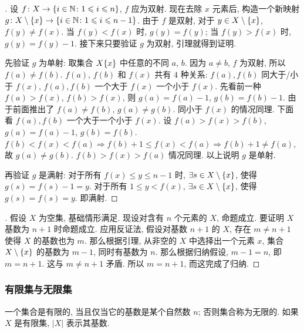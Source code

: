 \documentclass[UTF8]{ctexart}
\theoremstyle{mystyle}
\theoremstyle{myremark}
\theoremstyle{plain}
\newcommand{\N}{\mathbb N}
\DeclarePairedDelimiter\set{\{}{\}}
\begin{document}
\begin{proof}[]
    设 $ f \colon X \to \set{i \in \N \colon 1 \leqslant i \leqslant n} $, $ f $ 应为双射. 现在去除 $ x $ 元素后, 构造一个新映射 $ g \colon X \setminus \set x \to \set{i \in \N \colon 1 \leqslant i \leqslant n - 1} $. 由于 $ f $ 是双射, 对于 $ y \in X \setminus \set x $, $ f(y) \neq f(x) $. 当 $ f(y) < f(x) $ 时, $ g(y) = f(y) $; 当 $ f(y) > f(x) $ 时, $ g(y) = f(y) - 1 $. 接下来只要验证 $ g $ 为双射, 引理就得到证明. 
    
    先验证 $ g $ 为单射: 取集合 $ X \set{x} $ 中任意的不同 $ a $, $ b $. 因为 $ a \neq b $, $ f $ 为双射, 所以 $ f(a) \neq f(b) $. $ f(a) $, $ f(b) $ 和 $ f(x) $ 共有 $ 4 $ 种关系: $ f(a), f(b) $ 同大于/小于 $ f(x) $, $ f(a), f(b) $ 一个大于 $ f(x) $ 一个小于 $ f(x) $. 先看前一种 $ f(a) > f(x) $, $ f(b) > f(x) $, 则 $ g(a) = f(a) - 1 $, $ g(b) = f(b) - 1 $. 由于前面推出了 $ f(a) \neq f(b) $, $ g(a) \neq g(b) $. 同小于 $ f(x) $ 的情况同理. 下面看 $ f(a), f(b) $ 一个大于一个小于 $ f(x) $. 设 $ f(a) > f(x) > f(b) $, $ g(a) = f(a) - 1 $, $ g(b) = f(b) $. $ f(b) < f(x) < f(a) \Longrightarrow f(b) + 1 \leqslant f(x) < f(a) \Longrightarrow f(b) + 1 \neq f(a) $, 故 $ g(a) \neq g(b) $. $ f(b) > f(x) > f(a) $ 情况同理. 以上说明 $ g $ 是单射.

    再验证 $ g $ 是满射: 对于所有 $ f(x) \leqslant y \leqslant n - 1 $ 时, $ \exists s \in X \setminus \set x $, 使得 $ g(s) = f(s) - 1 = y $. 对于所有 $ 1 \leqslant y < f(x) $, $ \exists s \in X \setminus \set x $, 使得 $ g(s) = f(s) = y $. 即满射.
\end{proof}


\begin{proof}[]
    假设 $ X $ 为空集, 基础情形满足. 现设对含有 $ n $ 个元素的 $ X $, 命题成立. 要证明 $ X $ 基数为 $ n + 1 $ 时命题成立. 应用反证法, 假设对基数 $ n + 1 $ 的 $ X $, 存在 $ m \neq n + 1 $ 使得 $ X $ 的基数也为 $ m $. 那么根据引理, 从非空的 $ X $ 中选择出一个元素 $ x $, 集合 $ X \setminus \set{x} $ 的基数为 $ m - 1 $, 同时有基数为 $ n $. 那么根据归纳假设, $ m - 1 = n $, 即 $ m = n + 1 $. 这与 $ m \neq n + 1 $ 矛盾. 所以 $ m = n + 1 $, 而这完成了归纳.
\end{proof}


\subsubsection{有限集与无限集}
\begin{definition}
    一个集合是有限的, 当且仅当它的基数是某个自然数 $ n $; 否则集合称为无限的. 如果 $ X $ 是有限集, $ |X| $ 表示其基数.
\end{definition}
\end{document}
